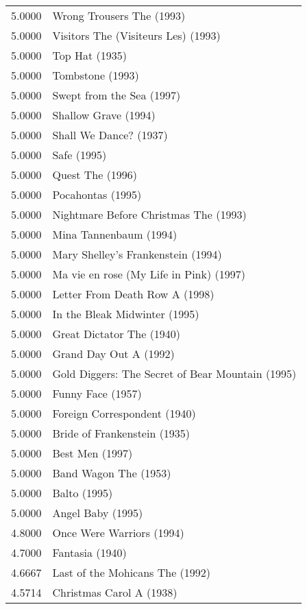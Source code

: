 \begin{flushleft}


\begin{table}[h]
\centering
\begin{tabular}{ll}
5.0000 & Wrong Trousers The (1993)                        \\
5.0000 & Visitors The (Visiteurs Les) (1993)              \\
5.0000 & Top Hat (1935)                                   \\
5.0000 & Tombstone (1993)                                 \\
5.0000 & Swept from the Sea (1997)                        \\
5.0000 & Shallow Grave (1994)                             \\
5.0000 & Shall We Dance? (1937)                           \\
5.0000 & Safe (1995)                                      \\
5.0000 & Quest The (1996)                                 \\
5.0000 & Pocahontas (1995)                                \\
5.0000 & Nightmare Before Christmas The (1993)            \\
5.0000 & Mina Tannenbaum (1994)                           \\
5.0000 & Mary Shelley's Frankenstein (1994)               \\
5.0000 & Ma vie en rose (My Life in Pink) (1997)          \\
5.0000 & Letter From Death Row A (1998)                   \\
5.0000 & In the Bleak Midwinter (1995)                    \\
5.0000 & Great Dictator The (1940)                        \\
5.0000 & Grand Day Out A (1992)                           \\
5.0000 & Gold Diggers: The Secret of Bear Mountain (1995) \\
5.0000 & Funny Face (1957)                                \\
5.0000 & Foreign Correspondent (1940)                     \\
5.0000 & Bride of Frankenstein (1935)                     \\
5.0000 & Best Men (1997)                                  \\
5.0000 & Band Wagon The (1953)                            \\
5.0000 & Balto (1995)                                     \\
5.0000 & Angel Baby (1995)                                \\ \hline
4.8000 & Once Were Warriors (1994)                        \\ \hline
4.7000 & Fantasia (1940)                                  \\ \hline
4.6667 & Last of the Mohicans The (1992)                  \\ \hline
4.5714 & Christmas Carol A (1938)                         \\


\end{tabular}
\end{table}
\end{flushleft}
